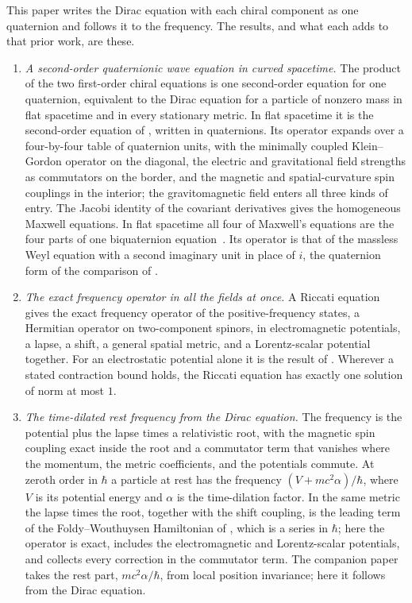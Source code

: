 \documentclass[aps,prd,onecolumn,tightenlines,nofootinbib,notitlepage,11pt,floatfix]{revtex4-2}
\theoremstyle{indentedtheorem}
\begin{document}
This paper writes the Dirac equation with each chiral component as one quaternion and follows it to the frequency. The results, and what each adds to that prior work, are these.
\begin{enumerate}[label=(\roman*)]
\item \emph{A second-order quaternionic wave equation in curved spacetime.} The product of the two first-order chiral equations is one second-order equation for one quaternion, equivalent to the Dirac equation for a particle of nonzero mass in flat spacetime and in every stationary metric. In flat spacetime it is the second-order equation of \citet{FeynmanGellMann1958Theory}, written in quaternions. Its operator expands over a four-by-four table of quaternion units, with the minimally coupled Klein--Gordon operator on the diagonal, the electric and gravitational field strengths as commutators on the border, and the magnetic and spatial-curvature spin couplings in the interior; the gravitomagnetic field enters all three kinds of entry. The Jacobi identity of the covariant derivatives gives the homogeneous Maxwell equations. In flat spacetime all four of Maxwell's equations are the four parts of one biquaternion equation~\citep{Silberstein1912Quaternionic}. Its operator is that of the massless Weyl equation with a second imaginary unit in place of $i$, the quaternion form of the comparison of \citet{BialynickiBirula1996Photon}.
\item \emph{The exact frequency operator in all the fields at once.} A Riccati equation gives the exact frequency operator of the positive-frequency states, a Hermitian operator on two-component spinors, in electromagnetic potentials, a lapse, a shift, a general spatial metric, and a Lorentz-scalar potential together. For an electrostatic potential alone it is the result of \citet{Heully1986Diagonalisation}. Wherever a stated contraction bound holds, the Riccati equation has exactly one solution of norm at most $1$.
\item \emph{The time-dilated rest frequency from the Dirac equation.} The frequency is the potential plus the lapse times a relativistic root, with the magnetic spin coupling exact inside the root and a commutator term that vanishes where the momentum, the metric coefficients, and the potentials commute. At zeroth order in $\hbar$ a particle at rest has the frequency $(V+mc^2\alpha)/\hbar$, where $V$ is its potential energy and $\alpha$ is the time-dilation factor. In the same metric the lapse times the root, together with the shift coupling, is the leading term of the Foldy--Wouthuysen Hamiltonian of \citet{ObukhovSilenkoTeryaev2011Dirac}, which is a series in $\hbar$; here the operator is exact, includes the electromagnetic and Lorentz-scalar potentials, and collects every correction in the commutator term. The companion paper takes the rest part, $mc^2\alpha/\hbar$, from local position invariance; here it follows from the Dirac equation.

\end{enumerate}
\end{document}

